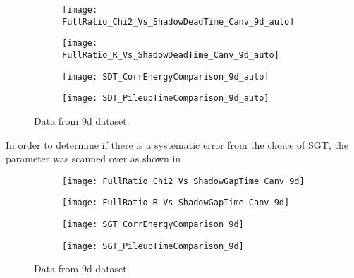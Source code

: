\begin{figure}[]
\centering
    \begin{subfigure}[]{0.45\textwidth}
        \centering
        \texttt{[image: FullRatio\_Chi2\_Vs\_ShadowDeadTime\_Canv\_9d\_auto]}
        \caption{}
    \end{subfigure}%
    \begin{subfigure}[]{0.45\textwidth}
        \centering
        \texttt{[image: FullRatio\_R\_Vs\_ShadowDeadTime\_Canv\_9d\_auto]}
        \caption{}
    \end{subfigure}

    \begin{subfigure}[]{0.45\textwidth}
        \centering
        \texttt{[image: SDT\_CorrEnergyComparison\_9d\_auto]}
        \caption{}
    \end{subfigure}%
    \begin{subfigure}[]{0.45\textwidth}
        \centering
        \texttt{[image: SDT\_PileupTimeComparison\_9d\_auto]}
        \caption{}
    \end{subfigure}
\caption[]{Data from 9d dataset.}
\label{fig:}
\end{figure}



In order to determine if there is a systematic error from the choice of SGT, the parameter was scanned over as shown in \figref{}


\begin{figure}[]
\centering
    \begin{subfigure}[]{0.45\textwidth}
        \centering
        \texttt{[image: FullRatio\_Chi2\_Vs\_ShadowGapTime\_Canv\_9d]}
        \caption{}
    \end{subfigure}%
    \begin{subfigure}[]{0.45\textwidth}
        \centering
        \texttt{[image: FullRatio\_R\_Vs\_ShadowGapTime\_Canv\_9d]}
        \caption{}
    \end{subfigure}

    \begin{subfigure}[]{0.45\textwidth}
        \centering
        \texttt{[image: SGT\_CorrEnergyComparison\_9d]}
        \caption{}
    \end{subfigure}%
    \begin{subfigure}[]{0.45\textwidth}
        \centering
        \texttt{[image: SGT\_PileupTimeComparison\_9d]}
        \caption{}
    \end{subfigure}
\caption[]{Data from 9d dataset.}
\label{fig:}
\end{figure}


